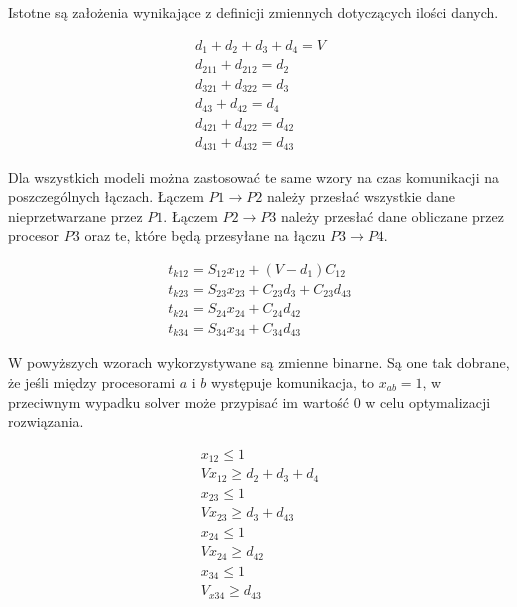 Istotne są założenia wynikające z definicji zmiennych dotyczących ilości danych.

\begin{equation} \label{eq:data}
\begin{array}{l}
d_{1} + d_{2} + d_{3} + d_{4} = V \\
d_{211} + d_{212} = d_{2} \\
d_{321} + d_{322} = d_{3} \\
d_{43} + d_{42} = d_{4} \\
d_{421} + d_{422} = d_{42} \\
d_{431} + d_{432} = d_{43}
\end{array}
\end{equation}

Dla wszystkich modeli można zastosować te same wzory na czas komunikacji na poszczególnych łączach.
Łączem $P1 \to P2$ należy przesłać wszystkie dane nieprzetwarzane przez $P1$.
Łączem $P2 \to P3$ należy przesłać dane obliczane przez procesor $P3$ oraz te, które będą przesyłane na łączu $P3 \to P4$. 

\begin{equation} \label{eq:tk}
\begin{array}{l}
t_{k12} = S_{12}x_{12} + (V - d_{1})C_{12} \\
t_{k23} = S_{23}x_{23} + C_{23}d_{3} + C_{23}d_{43} \\
t_{k24} = S_{24}x_{24} + C_{24}d_{42} \\
t_{k34} = S_{34}x_{34} + C_{34}d_{43}
\end{array}
\end{equation}

W powyższych wzorach wykorzystywane są zmienne binarne. Są one tak dobrane, że jeśli między procesorami $a$ i $b$ występuje komunikacja,
to $x_{ab} = 1$, w przeciwnym wypadku solver może przypisać im wartość $0$ w celu optymalizacji rozwiązania.

\begin{equation} \label{eq:x}
\begin{array}{l}
x_{12} \leq 1 \\
Vx_{12} \geq d_{2} + d_{3} + d_{4} \\
x_{23} \leq 1 \\
Vx_{23} \geq d_{3} + d_{43} \\
x_{24} \leq 1 \\
Vx_{24} \geq d_{42} \\
x_{34} \leq 1 \\
V_{x34} \geq d_{43}
\end{array}
\end{equation}

